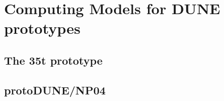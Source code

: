 \section{Computing Models for DUNE prototypes}
\subsection{The 35t prototype}

\newpage
\subsection{protoDUNE/NP04}



\newpage



